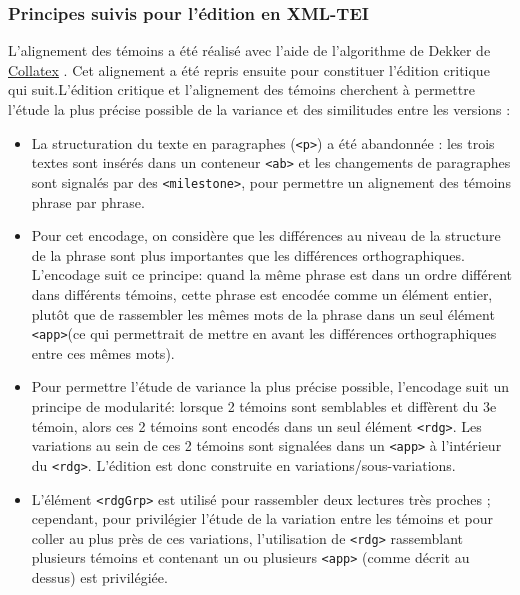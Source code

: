 \documentclass[12pt, a4paper]{article}
\begin{document}
                \subsubsection{Principes suivis pour l'édition en XML-TEI}
                L'alignement des témoins a été réalisé avec l'aide de l'algorithme de Dekker de  \href{https://collatex.net/}{Collatex} . Cet alignement a été repris ensuite pour constituer l'édition critique qui suit.L'édition critique et l'alignement des témoins cherchent à permettre l'étude la plus précise possible de la variance et des similitudes entre les versions : \begin{itemize} 
           \item{La structuration du texte en paragraphes (\texttt{<p>}) a été abandonnée : les trois textes sont insérés dans un conteneur \texttt{<ab>} 
            et les changements de paragraphes sont signalés par des \texttt{<milestone>}, pour permettre un alignement des témoins phrase par phrase.} 
           \item{Pour cet encodage, on considère que les différences au niveau de la structure de la phrase sont plus importantes que les différences orthographiques. L'encodage suit ce principe:
            quand la même phrase est dans un ordre différent dans différents témoins, cette phrase est encodée comme un élément entier, 
            plutôt que de rassembler les mêmes mots de la phrase dans un seul élément \texttt{<app>}(ce qui permettrait de mettre en avant les différences orthographiques entre ces mêmes mots).} 
           \item{Pour permettre l'étude de variance la plus précise possible, l'encodage suit un principe de modularité: lorsque 2 témoins sont semblables et diffèrent du 3e témoin, 
            alors ces 2 témoins sont encodés dans un seul élément \texttt{<rdg>}. Les variations au sein de ces 2 témoins sont signalées dans un \texttt{<app>} à l'intérieur du \texttt{<rdg>}.
            L'édition est donc construite en variations/sous-variations.} 
           \item{L'élément \texttt{<rdgGrp>} est utilisé pour rassembler deux lectures très proches ; cependant, pour privilégier l'étude de la variation entre les témoins
            et pour coller au plus près de ces variations, l'utilisation de \texttt{<rdg>} rassemblant plusieurs témoins et contenant un ou plusieurs \texttt{<app>} (comme décrit au dessus) est privilégiée.} 
         \end{itemize} 
\end{document}
